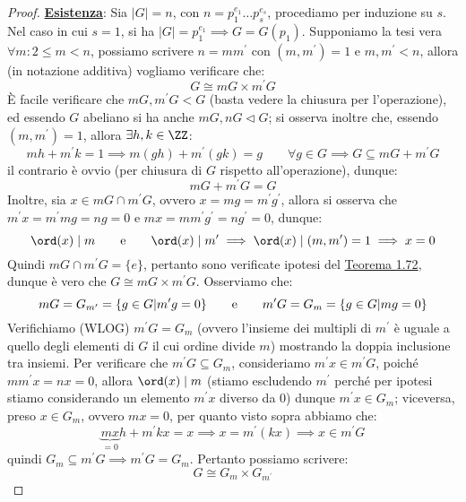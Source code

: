 \documentclass[11pt]{scrartcl}
\begin{document}
\begin{proof}
    \underline{\textbf{Esistenza}}: Sia $|G| = n$, con $n = p_1^{e_1} \ldots p_s^{e_s}$, procediamo per induzione su $s$. Nel caso in cui $s = 1$, si ha $|G| = p_1^{e_1} \implies G = G(p_1)$. Supponiamo 
    la tesi vera $\forall m : 2 \leq m < n$, possiamo scrivere $n = m m^{\prime}$ con $(m,m^{\prime}) = 1$ e $m,m^{\prime} < n$, allora (in notazione additiva) vogliamo verificare che:
        \[ G \cong mG \times m^{\prime}G
            \]
        È facile verificare che $mG,m^{\prime}G < G$ (basta vedere la chiusura per l'operazione), ed essendo $G$ abeliano si ha anche $mG,nG \triangleleft G$; si osserva inoltre che, essendo $(m,m^{\prime}) = 1$, allora $\exists h,k \in \ZZ$:
            \[ mh + m^{\prime}k = 1 \implies m(gh) + m^{\prime}(gk) = g \qquad \forall g \in G \implies G \subseteq mG + m^{\prime}G
                \]
        il contrario è ovvio (per chiusura di $G$ rispetto all'operazione), dunque:
            \[ mG + m^{\prime}G = G
                \]
        Inoltre, sia $x \in mG \cap m^{\prime}G$, ovvero $x = mg = m^{\prime}g^{\prime}$, allora si osserva che $m^{\prime}x = m^{\prime}mg = ng = 0$ e $mx = mm^{\prime}g^{\prime} = ng^{\prime} = 0$, dunque:
            \[ \ord(x) \mid m \qquad \text e \qquad \ord(x) \mid m^{\prime} \implies \ord(x) \mid (m,m^{\prime}) = 1 \implies x = 0
                \]
        Quindi $mG \cap m^{\prime}G = \{e\}$, pertanto sono verificate ipotesi del \hyperref[t:1.72]{Teorema 1.72}, dunque è vero che $G \cong mG \times m^{\prime}G$. Osserviamo che:
            \[ mG = G_{m^{\prime}} = \{g \in G | m^{\prime}g = 0\} \qquad \text e \qquad m^{\prime}G = G_m = \{g \in G | mg = 0\}
                \]
        Verifichiamo (WLOG) $m^{\prime}G = G_m$ (ovvero l'insieme dei multipli di $m^{\prime}$ è uguale a quello degli elementi di $G$ il cui ordine divide $m$) mostrando la doppia inclusione tra insiemi.
        Per verificare che $m^{\prime}G \subseteq G_m$, consideriamo $m^{\prime}x \in m^{\prime}G$, poiché $mm^{\prime}x = nx = 0$, allora $\ord(x) \mid m$ (stiamo escludendo $m^{\prime}$ perché per ipotesi
        stiamo considerando un elemento $m^{\prime}x$ diverso da 0) dunque $m^{\prime}x \in G_m$; viceversa, preso $x \in G_m$, ovvero $mx = 0$, per quanto visto sopra abbiamo che:
            \[ \underbrace{mx}_{= 0}h + m^{\prime}kx = x \implies x = m^{\prime}(kx) \implies x \in m^{\prime}G
                \]
        quindi $G_m \subseteq m^{\prime}G \implies m^{\prime}G = G_m$. Pertanto possiamo scrivere:
            \[ G \cong G_m \times G_{m^\prime}
                \]

\end{proof}
\end{document}
